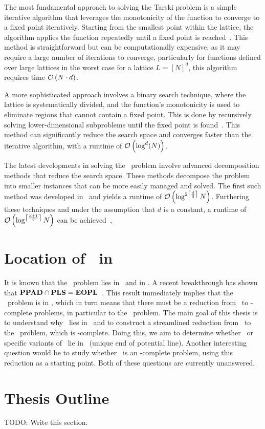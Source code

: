 The most fundamental approach to solving the Tarski problem is a simple iterative algorithm that leverages the monotonicity of the function to converge to a fixed point iteratively. Starting from the smallest point within the lattice, the algorithm applies the function repeatedly until a fixed point is reached~. This method is straightforward but can be computationally expensive, as it may require a large number of iterations to converge, particularly for functions defined over large lattices in the worst case for a lattice $L = {[N]}^d$, this algorithm requires time $\mathcal{O}\left(N \cdot d\right)$.

A more sophisticated approach involves a binary search technique, where the lattice is systematically divided, and the function's monotonicity is used to eliminate regions that cannot contain a fixed point. This is done by recursively solving lower-dimensional subproblems until the fixed point is found~. This method can significantly reduce the search space and converges faster than the iterative algorithm, with a runtime of $\mathcal{O}\left(\log^d(N)\right)$.

The latest developments in solving the \Tarski\ problem involve advanced decomposition methods that reduce the search space. These methods decompose the problem into smaller instances that can be more easily managed and solved. The first such method was developed in~\cite{fearnley_faster_2022} and yields a runtime of $\mathcal{O}\left(\log^{2\left\lceil\frac{d}{3}\right\rceil}{N}\right)$. Furthering these techniques and under the assumption that $d$ is a constant, a runtime of $\mathcal{O}\left(\log^{\left\lceil\frac{d+1}{2}\right\rceil}{N}\right)$ can be achieved~,

\section{Location of \Tarski\ in \TFNP}\label{sec:intro_location_tarski}

It is known that the \Tarski\ problem lies in \PPAD\ and in \PLS\@. A recent breakthrough has shown that $\textbf{PPAD} \cap \textbf{PLS} = \textbf{EOPL}$~. This result immediately implies that the \Tarski\ problem is in \EOPL, which in turn means that there must be a reduction from \Tarski\ to \EOPL-complete problems, in particular to the \EndOfPotentialLine\ problem. The main goal of this thesis is to understand why \Tarski\ lies in \EOPL\ and to construct a streamlined reduction from \Tarski\ to the \EndOfPotentialLine\ problem, which is \EOPL-complete. Doing this, we aim to determine whether \Tarski\ or specific variants of \Tarski\ lie in \UEOPL\ (unique end of potential line). Another interesting question would be to study whether \Tarski\ is an \EOPL-complete problem, using this reduction as a starting point. Both of these questions are currently unanswered.

\section{Thesis Outline}\label{sec:intro_outline}

TODO\@: Write this section.
